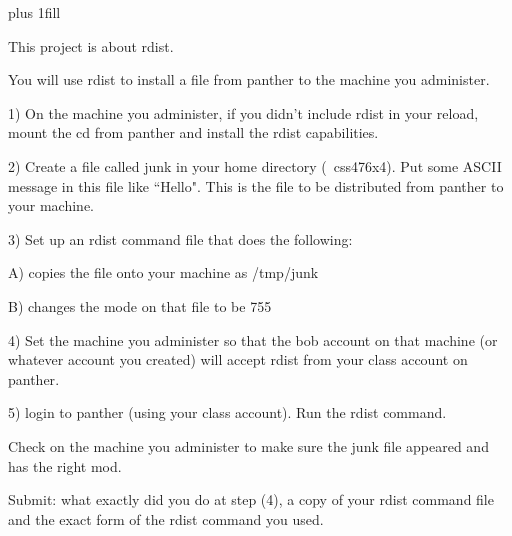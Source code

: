 
\rightskip=0pt plus 1fill

\parindent 0pt

This project is about rdist.

You will use rdist to install a file from {\ltt{}panther} to the machine 
you administer.

1) On the machine you administer, if you didn't include rdist in your reload,
mount the cd from {\ltt{}panther} and install the rdist capabilities.

2) Create a file called {\ltt{}junk} in your home directory ({\ltt{}~css476x4}).
Put some ASCII message in this file like ``Hello".
This is the file to be distributed from {\ltt{}panther} to your machine.

3) Set up an rdist command file that does the following:

A) copies the file onto your machine as {\ltt{}/tmp/junk}

B) changes the mode on that file to be {\ltt{}755}

4) Set the machine you administer so that the {\ltt{}bob} account on that
machine (or whatever account you created) will accept rdist from your
class account on {\ltt{}panther}.

5) login to {\ltt{}panther} (using your class account).
Run the rdist command.

Check on the machine you administer to make sure the junk file appeared
and has the right mod.

Submit: what exactly did you do at step (4),
a copy of your rdist command file and
the exact form of the rdist command you used.
\bye
